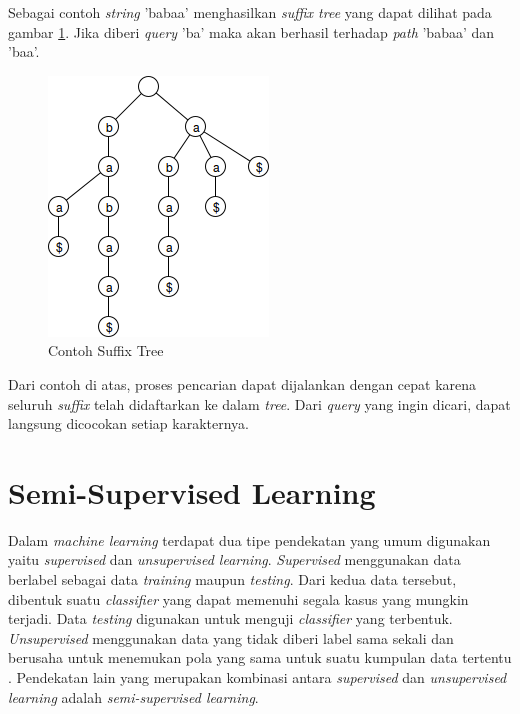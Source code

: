 Sebagai contoh \textit{string} 'babaa' menghasilkan \textit{suffix tree} yang dapat dilihat pada gambar \ref{fig:contoh-suffix-tree}. Jika diberi \textit{query} 'ba' maka akan berhasil terhadap \textit{path} 'babaa' dan 'baa'.
\begin{figure}
    \centering
    \includegraphics[scale=0.6]{pics/Contoh-SuffixTree}
    \caption{Contoh Suffix Tree}
    \label{fig:contoh-suffix-tree}
\end{figure}

\noindent Dari contoh di atas, proses pencarian dapat dijalankan dengan cepat karena seluruh \textit{suffix} telah didaftarkan ke dalam \textit{tree}. Dari \textit{query} yang ingin dicari, dapat langsung dicocokan setiap karakternya.

%
\section{Semi-Supervised Learning}
Dalam \textit{machine learning} terdapat dua tipe pendekatan yang umum digunakan yaitu \textit{supervised} dan \textit{unsupervised learning}. \textit{Supervised} menggunakan data berlabel sebagai data \textit{training} maupun \textit{testing}. Dari kedua data tersebut, dibentuk suatu \textit{classifier} yang dapat memenuhi segala kasus yang mungkin terjadi. Data \textit{testing} digunakan untuk menguji \textit{classifier} yang terbentuk. \textit{Unsupervised} menggunakan data yang tidak diberi label sama sekali dan berusaha untuk menemukan pola yang sama untuk suatu kumpulan data tertentu \citep{prakash2014survey}. Pendekatan lain yang merupakan kombinasi antara \textit{supervised} dan \textit{unsupervised learning} adalah \textit{semi-supervised learning}. 

